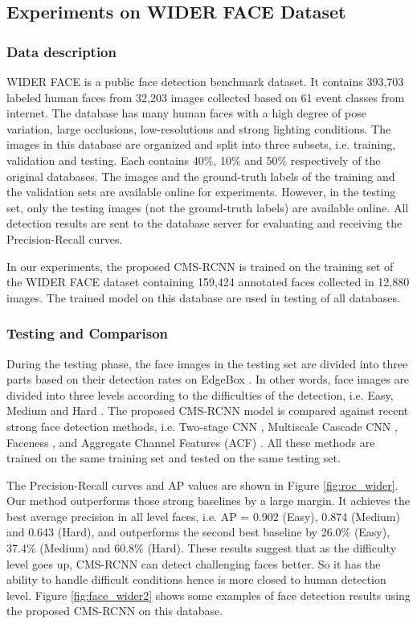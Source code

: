 \documentclass[10pt,journal,cspaper,compsoc]{IEEEtran}
\begin{document}
\subsection{Experiments on WIDER FACE Dataset}
\label{subsec:expWider}
\subsubsection*{Data description}
WIDER FACE is a public face detection benchmark dataset. It contains 393,703 labeled human faces from 32,203 images collected based on 61 event classes from internet. The database has many human faces with a high degree of pose variation, large occlusions, low-resolutions and strong lighting conditions. The images in this database are organized and split into three subsets, i.e. training, validation and testing. Each contains 40\%, 10\% and 50\% respectively of the original databases.
The images and the ground-truth labels of the training and the validation sets are available online for experiments. However, in the testing set, only the testing images (not the ground-truth labels) are available online. All detection results are sent to the database server for evaluating and receiving the Precision-Recall curves.

In our experiments, the proposed CMS-RCNN is trained on the training set of the WIDER FACE dataset containing 159,424 annotated faces collected in 12,880 images. The trained model on this database are used in testing of all databases.

\subsubsection*{Testing and Comparison}
During the testing phase, the face images in the testing set are divided into three parts based on their detection rates on EdgeBox \cite{zitnick2014edge}. In other words, face images are divided into three levels according to the difficulties of the detection, i.e. Easy, Medium and Hard \cite{yang2016wider}. The proposed CMS-RCNN model is compared against recent strong face detection methods, i.e. Two-stage CNN \cite{yang2016wider}, Multiscale Cascade CNN \cite{yang2016wider}, Faceness \cite{yang2015faceness}, and Aggregate Channel Features (ACF) \cite{yang2014acf-multiscale}. All these methods are trained on the same training set and tested on the same testing set.

The Precision-Recall curves and AP values are shown in Figure \ref{fig:roc_wider}.
Our method outperforms those strong baselines by a large margin. It achieves the best average precision in all level faces, i.e. AP = 0.902 (Easy), 0.874 (Medium) and 0.643 (Hard), and outperforms the second best baseline by 26.0\% (Easy), 37.4\% (Medium) and 60.8\% (Hard). These results suggest that as the difficulty level goes up, CMS-RCNN can detect challenging faces better. So it has the ability to handle difficult conditions hence is more closed to human detection level. Figure \ref{fig:face_wider2} shows some examples of face detection results using the proposed CMS-RCNN on this database.
\end{document}
